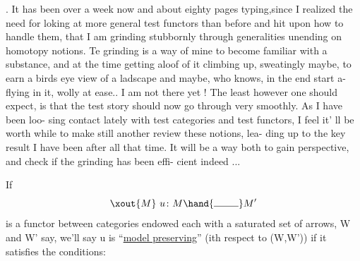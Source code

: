 .  It has been over a week now and about eighty pages typing,since I
realized the need for loking at more general test functors than before
and hit upon how to handle them, that I am grinding stubbornly through
generalities unending on homotopy notions.  Te grinding is a way of mine
to become familiar with a substance,  and at the  time getting aloof of it\unsure{\hand{,}}
climbing up,  sweatingly maybe,  to earn a birds eye view of a ladscape
and maybe,  who knows,  in the end start a-flying in it, wolly at ease..
I am not there yet !  The least however one should expect,  is that
the test story should now go through very smoothly. As I have been loo-%
sing contact lately with test categories and test functors,  I feel it'
ll be worth while to make still another review  these notions,  lea-%
ding up to the key result I have been after all that time.  It will be
a way both to gain perspective,  and check if the grinding has been effi-%
cient indeed ...

If
\[ \xout{M}\ u\colon M \hand{\mathrel{\rule{2.5em}{.4pt}}} M' \]
is a functor between categories endowed each with a saturated set of
arrows,  W and W' say,  we'll say u is ``\uline{model preserving}''  (ith respect
to (W,W')) if it satisfies the conditions:


